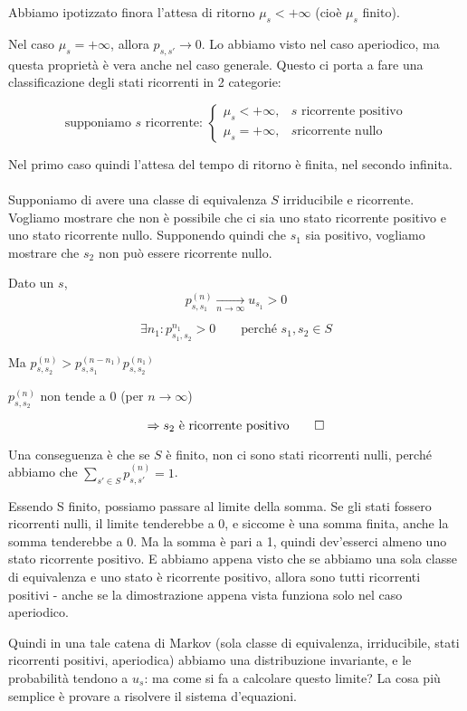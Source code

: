\documentclass[a4paper,12pt]{book}
\begin{document}
Abbiamo ipotizzato finora l'attesa di ritorno $\mu_s < +\infty$ (cioè $\mu_s$ finito).

Nel caso $\mu_s = + \infty$, allora $ p_{s,s'} \to 0 $. Lo abbiamo visto nel caso aperiodico, ma questa proprietà è vera anche nel caso generale. Questo ci porta a fare una classificazione degli stati ricorrenti in 2 categorie:

$$ \text{supponiamo } s \text{ ricorrente: } \begin{cases*}
	\mu_s < +\infty, & s \text{ ricorrente positivo} \\
	\mu_s = + \infty, & s \text{ricorrente nullo}
\end{cases*}$$

Nel primo caso quindi l'attesa del tempo di ritorno è finita, nel secondo infinita. 
\\
\\
Supponiamo di avere una classe di equivalenza $ S $ irriducibile e ricorrente. Vogliamo mostrare che non è possibile che ci sia uno stato ricorrente positivo e uno stato ricorrente nullo. Supponendo quindi che $ s_1 $ sia positivo, vogliamo mostrare che $ s_2 $ non può essere ricorrente nullo. 

Dato un $ s $,
$$ p_{s,s{_1}}^{(n)} \underset{n \to \infty}{\longrightarrow} u_{s_{1}} > 0$$

$$ \exists n_1 : p_{s_1, s_2}^{n_1} > 0 \qquad \text{perché } s_1, s_2 \in S  $$

Ma $ p_{s,s_2}^{(n)} > p_{s,s_1}^{(n - n_1)} p_{s,s_2}^{(n_1)} $

$ p_{s,s_2}^{(n)} $ non tende a 0 (per $ n \to \infty $)

$$ \Rightarrow s_2 \text{ è ricorrente positivo} \qed $$

Una conseguenza è che se $ S $ è finito, non ci sono stati ricorrenti nulli, perché abbiamo che $ \sum_{s' \in S} p_{s,s'}^{(n)} = 1 $.


Essendo S finito, possiamo passare al limite della somma. Se gli stati fossero ricorrenti nulli, il limite tenderebbe a 0, e siccome è una somma finita, anche la somma tenderebbe a 0. Ma la somma è pari a 1, quindi dev'esserci almeno uno stato ricorrente positivo. E abbiamo appena visto che se abbiamo una sola classe di equivalenza e uno stato è ricorrente positivo, allora sono tutti ricorrenti positivi - anche se la dimostrazione appena vista funziona solo nel caso aperiodico. 

Quindi in una tale catena di Markov (sola classe di equivalenza, irriducibile, stati ricorrenti positivi, aperiodica) abbiamo una distribuzione invariante, e le probabilità tendono a $ u_s $: ma come si fa a calcolare questo limite? La cosa più semplice è provare a risolvere il sistema d'equazioni.
\end{document}
